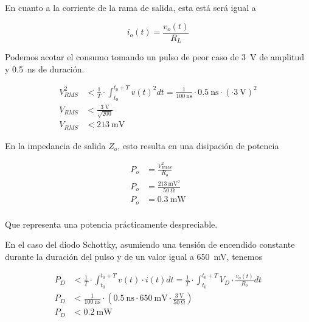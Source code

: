 En cuanto a la corriente de la rama de salida, esta está será igual a

\begin{equation}
    i_o(t) = \frac{v_o(t)}{R_L}
\end{equation}

Podemos acotar el consumo tomando un pulso de peor caso de \qty{3}{\volt} de
amplitud y \qty{0.5}{\nano\second} de duración.

\begin{equation}
    \begin{aligned}
        V_{RMS}^2 &< \frac{1}{T} \cdot \int_{t_0}^{t_0+T} v(t)^2dt =
        \frac{1}{\qty{100}{\nano\second}} \cdot \qty{0.5}{\nano\second} \cdot
        \left( \cdot \qty{3}{\volt} \right )^2 \\
        V_{RMS} &< \frac{\qty{3}{\volt}}{\sqrt{200}} \\
        V_{RMS} &< \qty{213}{\milli\volt}
    \end{aligned}
\end{equation}

En la impedancia de salida $Z_o$, esto resulta en una disipación de potencia

\begin{equation}
    \begin{aligned}
        P_{o} &= \frac{V_{RMS}^2}{R_o} \\
        P_{o} &= \frac{ \qty{213}{\milli\volt}^2}{ \qty{50}{\ohm}} \\
        P_{o} &= \qty{0.3}{\milli\watt} \\
    \end{aligned}
\end{equation}

Que representa una potencia prácticamente despreciable.

En el caso del diodo Schottky, asumiendo una tensión de encendido constante
durante la duración del pulso y de un valor igual a \qty{650}{\milli\volt},
tenemos

\begin{equation}
    \begin{aligned}
        P_{D} &< \frac{1}{T} \cdot \int_{t_0}^{t_0+T} v(t) \cdot i(t) dt =
        \frac{1}{T} \cdot \int_{t_0}^{t_0+T} V_D \cdot \frac{v_o(t)}{R_o} dt \\
        P_{D} &< \frac{1}{\qty{100}{\nano\second}} \cdot \left( \qty{0.5}{\nano\second} \cdot
        \qty{650}{\milli\volt} \cdot \frac{\qty{3}{\volt}}{
            \qty{50}{\ohm}} \right) \\
        P_{D} &< \qty{0.2}{\milli\watt} \\
    \end{aligned}
\end{equation}


